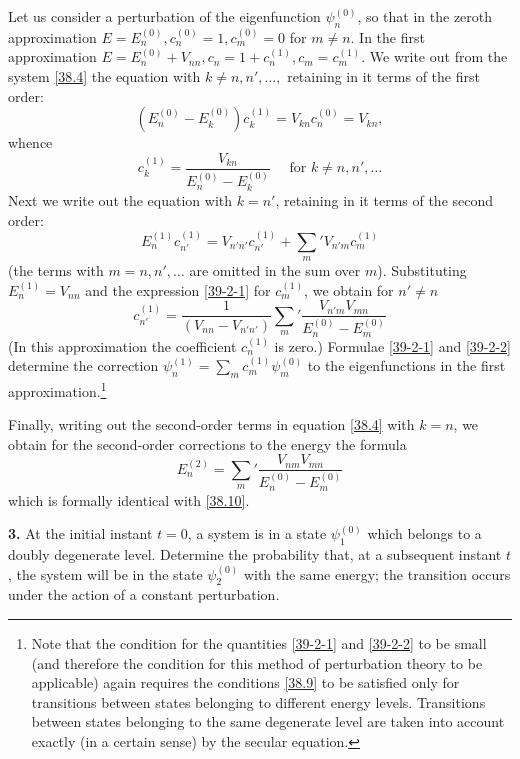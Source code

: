 {Let us consider a perturbation of the eigenfunction $ \psi_n^{(0)} $, so that in the zeroth approximation $ E = E_n^{(0)}, c_n^{(0)} = 1, c_m^{(0)} = 0 $ for $ m \ne n $. In the first approximation $ E = E_n^{(0)} + V_{nn}, c_n = 1 + c_n^{(1)}, c_m = c_m^{(1)} $. We write out from the system \eqref{38.4} the equation with $ k \ne n, n',\dots , $ retaining in it terms of the first order:
\[ (E_n^{(0)}-E_k^{(0)})c_k^{(1)}=V_{kn}c_n^{(0)}=V_{kn}, \]
whence
\begin{equation}\label{39-2-1}
c_k^{(1)}=\frac{V_{kn}}{E_{n}^{(0)}-E_k^{(0)}}\quad\text{  for  }k\ne n,n',\dots\tag{1}
\end{equation}
Next we write out the equation with $ k = n' $, retaining in it terms of the second order:
\[ E_n^{(1)}c_{n'}^{(1)}=V_{n'n'}c_{n'}^{(1)}+{\sum_m}'V_{n'm}c_m^{(1)} \]
(the terms with $ m = n, n', \dots $ are omitted in the sum over $ m $). Substituting $ E_n^{(1)} = V_{nn} $ and the expression \eqref{39-2-1} for $ c_m^{(1)} $, we obtain for $ n'\ne  n $
\begin{equation}\label{39-2-2}
c_{n'}^{(1)}=\frac{1}{(V_{nn}-V_{n'n'})}{\sum_m}'\frac{V_{n'm}V_{mn}}{E_n^{(0)}-E_m^{(0)}}\tag{2}
\end{equation}
(In this approximation the coefficient $ c_n^{(1)} $ is zero.) Formulae \eqref{39-2-1} and \eqref{39-2-2} determine the correction $ \psi_n^{(1)} = \sum_m c_m^{(1)} \psi_m^{(0)} $ to the eigenfunctions in the first approximation.\footnote{Note that the condition for the quantities \eqref{39-2-1} and \eqref{39-2-2} to be small (and therefore the condition for this method of perturbation theory to be applicable) again requires the conditions \eqref{38.9} to be satisfied only for transitions between states belonging to different energy levels. Transitions between states belonging to the same degenerate level are taken into account exactly (in a certain sense) by the secular equation.}

Finally, writing out the second-order terms in equation \eqref{38.4} with $ k = n $, we obtain for the second-order corrections to the energy the formula
\begin{equation}\label{39-2-3}
E_n^{(2)}={\sum_m}'\frac{V_{nm}V_{mn}}{E_n^{(0)}-E_m^{(0)}}\tag{3}
\end{equation}
which is formally identical with \eqref{38.10}.





\textbf{3.} At the initial instant $ t = 0 $, a system is in a state $ \psi_1^{(0)} $ which belongs to a doubly degenerate level. Determine the probability that, at a subsequent instant $ t $, the system will be in the state $ \psi_2^{(0)} $ with the same energy; the transition occurs under the action of a constant perturbation.





}
